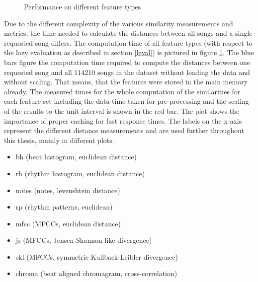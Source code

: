 \begin{figure}[htbp]
	\centering
	\caption{Performance on different feature types}
	\label{features}
\end{figure}
\FloatBarrier

\noindent Due to the different complexity of the various similarity measurements and metrics, the time needed to calculate the distances between all songs and a single requested song differs. 
\noindent The computation time of all feature types (with respect to the lazy evaluation as described in section \ref{leval}) is pictured in figure \ref{features}. 
\noindent The blue bars figure the computation time required to compute the distances between one requested song and all 114210 songs in the dataset without loading the data and without scaling. That means, that the features were stored in the main memory already. The measured times for the whole computation of the similarities for each feature set including the data time taken for pre-processing and the scaling of the results to the unit interval is shown in the red bar. The plot shows the importance of proper caching for fast response times. 
\noindent The labels on the x-axis represent the different distance measurements and are used further throughout this thesis, mainly in different plots. 

\begin{itemize}
	\setlength\itemsep{-0.5em}
	\item bh (beat histogram, euclidean distance)
	\item rh (rhythm histogram, euclidean distance)
	\item notes (notes, levenshtein distance)
	\item rp (rhythm patterns, euclidean)
	\item mfcc (MFCCs, euclidean distance)
	\item js (MFCCs, Jensen-Shannon-like divergence)
	\item skl (MFCCs, symmetric Kullback-Leibler divergence)
	\item chroma (beat aligned chromagram, cross-correlation)
\end{itemize}


